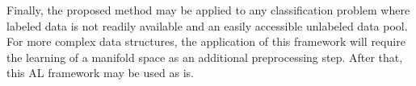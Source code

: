 Finally, the proposed method may be applied to any classification problem
where labeled data is not readily available and an easily accessible unlabeled
data pool. For more complex data structures, the application of this framework
will require the learning of a manifold space as an additional preprocessing
step. After that, this AL framework may be used as is.
